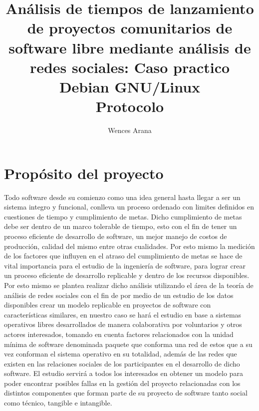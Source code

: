 \documentclass[12pt]{report}               \usepackage[utf8]{inputenc}
\begin{document}
  \title{  {Análisis  de  tiempos  de  lanzamiento  de
proyectos comunitarios  de software  libre mediante análisis  de redes
sociales:   Caso   practico    Debian   GNU/Linux}\\   {Protocolo}   }
\author{Wences Arana}
\maketitle

\tableofcontents
\chapter*{Propósito del proyecto}

Todo software desde  su comienzo como una idea general  hasta llegar a
ser un sistema  integro y funcional, conlleva un  proceso ordenado con
limites definidos  en cuestiones  de tiempo  y cumplimiento  de metas.
Dicho cumplimiento de  metas debe ser dentro de un  marco tolerable de
tiempo, esto con el fin de tener un proceso eficiente de desarrollo de
software, un mejor  manejo de costos de producción,  calidad del mismo
entre otras cualidades. Por esto mismo la medición de los factores que
influyen  en el  atraso del  cumplimiento de  metas se  hace de  vital
importancia para el estudio de  la ingeniería de software, para lograr
crear un  proceso eficiente de  desarrollo replicable y dentro  de los
recursos  disponibles.   Por  esto  mismo se  plantea  realizar  dicho
análisis utilizando el área de la teoría de análisis de redes sociales
con el fin de  por medio de un estudio de  los datos disponibles crear
un  modelo replicable  en  proyectos de  software con  características
similares,  en nuestro  caso se  hará el  estudio en  base a  sistemas
operativos libres desarrollados de manera colaborativa por voluntarios
y otros  actores interesados, tomando en  cuenta factores relacionados
con la unidad  mínima de software denominada paquete  que conforma una
red  de estos  que  a su  vez  conforman el  sistema  operativo en  su
totalidad, además de las redes  que existen en las relaciones sociales
de los participantes  en el desarrollo de dicho  software.  El estudio
servirá  a todos  los  interesados  en obtener  un  modelo para  poder
encontrar posibles fallas en la  gestión del proyecto relacionadas con
los distintos componentes que forman  parte de su proyecto de software
tanto social como técnico, tangible e intangible.
\end{document}
